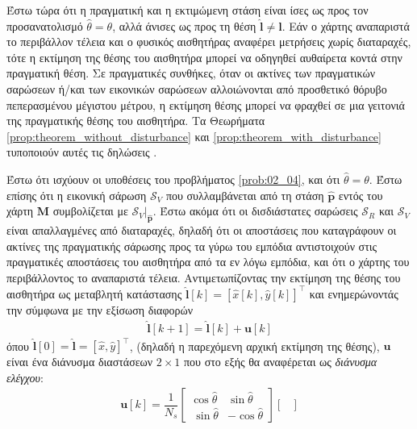 Έστω τώρα ότι η πραγματική και η εκτιμώμενη στάση είναι ίσες ως προς τον
προσανατολισμό $\hat{\theta} = \theta$, αλλά άνισες ως προς τη θέση
$\hat{\bm{l}} \neq \bm{l}$. Εάν ο χάρτης αναπαριστά το περιβάλλον τέλεια και ο
φυσικός αισθητήρας αναφέρει μετρήσεις χωρίς διαταραχές, τότε η εκτίμηση της
θέσης του αισθητήρα μπορεί να οδηγηθεί αυθαίρετα κοντά στην πραγματική θέση. Σε
πραγματικές συνθήκες, όταν οι ακτίνες των πραγματικών σαρώσεων ή/και των
εικονικών σαρώσεων αλλοιώνονται από προσθετικό θόρυβο πεπερασμένου μέγιστου
μέτρου, η εκτίμηση θέσης μπορεί να φραχθεί σε μια γειτονιά της πραγματικής
θέσης του αισθητήρα. Τα Θεωρήματα \ref{prop:theorem_without_disturbance} και
\ref{prop:theorem_with_disturbance} τυποποιούν αυτές τις δηλώσεις
\cite{Filotheou2022d}.


\begin{bw_box}
\begin{theorem}
  \label{prop:theorem_without_disturbance}
  Έστω ότι ισχύουν οι υποθέσεις του προβλήματος \ref{prob:02_04}, και ότι
  $\hat{\theta} = \theta$. Έστω επίσης ότι η εικονική σάρωση $\mathcal{S}_V$ που
  συλλαμβάνεται από τη στάση $\hat{\bm{p}}$ εντός του χάρτη $\bm{M}$
  συμβολίζεται με $\mathcal{S}_V|_{\bm{\hat{p}}}$. Έστω ακόμα ότι οι
  δισδιάστατες σαρώσεις $\mathcal{S}_R$ και $\mathcal{S}_V$ είναι απαλλαγμένες
  από διαταραχές, δηλαδή ότι οι αποστάσεις που καταγράφουν οι ακτίνες της
  πραγματικής σάρωσης προς τα γύρω του εμπόδια αντιστοιχούν στις πραγματικές
  αποστάσεις του αισθητήρα από τα εν λόγω εμπόδια, και ότι ο χάρτης του
  περιβάλλοντος το αναπαριστά τέλεια. Αντιμετωπίζοντας την
  εκτίμηση της θέσης του αισθητήρα ως μεταβλητή κατάστασης
  $\hat{\bm{l}}[k] = [\hat{x}[k], \hat{y}[k]]^\top$ και ενημερώνοντάς την
  σύμφωνα με την εξίσωση διαφορών
  \begin{align}
    \hat{\bm{l}}[k+1] = \hat{\bm{l}}[k] + \bm{u}[k]
    \label{eq:difference_equation_without_disturbance}
  \end{align}
  όπου $\hat{\bm{l}}[0] = \hat{\bm{l}} = [\hat{x}, \hat{y}]^{\top}$,
  (δηλαδή η παρεχόμενη αρχική εκτίμηση της θέσης), $\bm{u}$ είναι ένα διάνυσμα
  διαστάσεων $2 \times 1$ που στο εξής θα αναφέρεται ως
  \textit{διάνυσμα ελέγχου}:
  \begin{align}
    \bm{u}[k] = \dfrac{1}{N_s}
    \begin{bmatrix}
      \cos\hat{\theta} & \sin\hat{\theta} \\\
      \sin\hat{\theta} & - \cos\hat{\theta}
    \end{bmatrix}
    \begin{bmatrix}

\end{bmatrix}
\end{align}
\end{theorem}
\end{bw_box}
